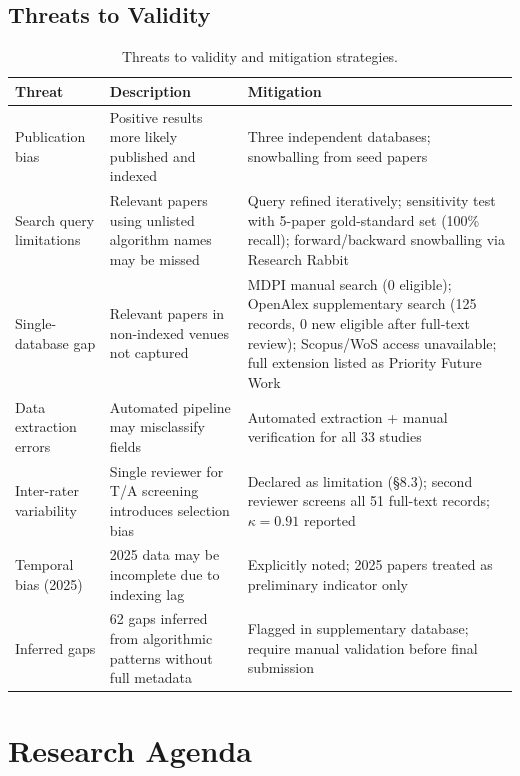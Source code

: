 \documentclass[review,3p,times]{elsarticle}
\begin{document}
\subsection{Threats to Validity}
\begin{table}[p]
\centering
\caption{Threats to validity and mitigation strategies.}
\label{tab:threats}
\small
\begin{tabularx}{\textwidth}{p{3cm}XX}
\toprule
\textbf{Threat} & \textbf{Description} & \textbf{Mitigation} \\
\midrule
Publication bias & Positive results more likely published and indexed & Three independent databases; snowballing from seed papers \\[4pt]
Search query limitations & Relevant papers using unlisted algorithm names may be missed & Query refined iteratively; sensitivity test with 5-paper gold-standard set (100\% recall); forward/backward snowballing via Research Rabbit \\[4pt]
Single-database gap & Relevant papers in non-indexed venues not captured & MDPI manual search (0 eligible); OpenAlex supplementary search (125 records, 0 new eligible after full-text review); Scopus/WoS access unavailable; full extension listed as Priority Future Work \\[4pt]
Data extraction errors & Automated pipeline may misclassify fields & Automated extraction + manual verification for all 33 studies \\[4pt]
Inter-rater variability & Single reviewer for T/A screening introduces selection bias & Declared as limitation (§8.3); second reviewer screens all 51 full-text records; $\kappa=0.91$ reported \\[4pt]
Temporal bias (2025) & 2025 data may be incomplete due to indexing lag & Explicitly noted; 2025 papers treated as preliminary indicator only \\[4pt]
Inferred gaps & 62 gaps inferred from algorithmic patterns without full metadata & Flagged in supplementary database; require manual validation before final submission \\
\bottomrule
\end{tabularx}
\end{table}

\section{Research Agenda}
\end{document}
